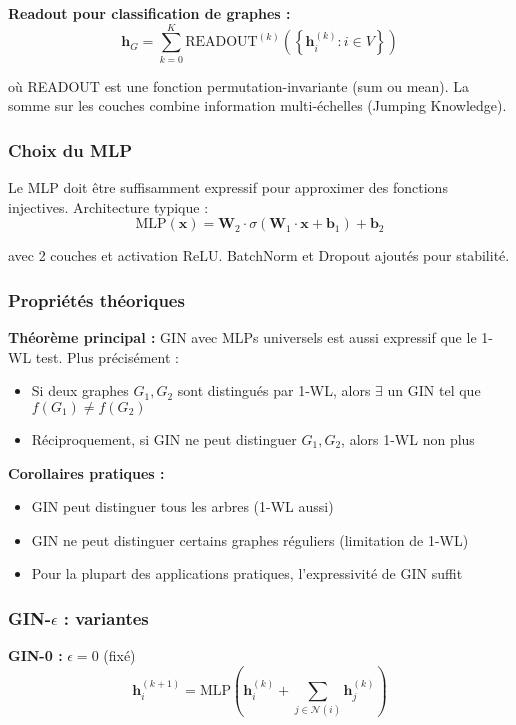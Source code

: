 \textbf{Readout pour classification de graphes :}
\[
\mathbf{h}_G = \sum_{k=0}^K \text{READOUT}^{(k)}\left(\left\{\mathbf{h}_i^{(k)} : i \in V\right\}\right)
\]

où READOUT est une fonction permutation-invariante (sum ou mean). La somme sur les couches combine information multi-échelles (Jumping Knowledge).

\subsubsection{Choix du MLP}

Le MLP doit être suffisamment expressif pour approximer des fonctions injectives. Architecture typique :
\[
\text{MLP}(\mathbf{x}) = \mathbf{W}_2 \cdot \sigma(\mathbf{W}_1 \cdot \mathbf{x} + \mathbf{b}_1) + \mathbf{b}_2
\]

avec 2 couches et activation ReLU. BatchNorm et Dropout ajoutés pour stabilité.

\subsubsection{Propriétés théoriques}

\textbf{Théorème principal :}
GIN avec MLPs universels est aussi expressif que le 1-WL test. Plus précisément :
\begin{itemize}
    \item Si deux graphes $G_1, G_2$ sont distingués par 1-WL, alors $\exists$ un GIN tel que $f(G_1) \neq f(G_2)$
    \item Réciproquement, si GIN ne peut distinguer $G_1, G_2$, alors 1-WL non plus
\end{itemize}

\textbf{Corollaires pratiques :}
\begin{itemize}
    \item GIN peut distinguer tous les arbres (1-WL aussi)
    \item GIN ne peut distinguer certains graphes réguliers (limitation de 1-WL)
    \item Pour la plupart des applications pratiques, l'expressivité de GIN suffit
\end{itemize}

\subsubsection{GIN-$\epsilon$ : variantes}

\textbf{GIN-0 :} $\epsilon = 0$ (fixé)
\[
\mathbf{h}_i^{(k+1)} = \text{MLP}\left(\mathbf{h}_i^{(k)} + \sum_{j \in \mathcal{N}(i)} \mathbf{h}_j^{(k)}\right)
\]

